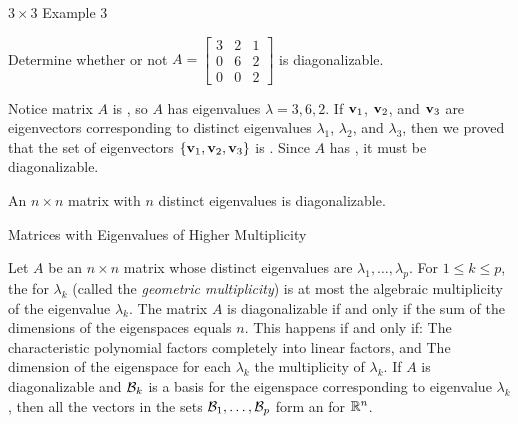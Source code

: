 \documentclass[xcolor=dvipsnames,aspectratio=169,t]{beamer}
\begin{document}
\begin{frame}{$3 \times 3$ Example 3}
  \medskip

  Determine whether or not $A = \begin{bmatrix} 3 & 2 & 1 \\ 0 & 6 & 2 \\  0 & 0 & 2 \end{bmatrix}$ is diagonalizable.
  \bigskip

  \pause
  \bi
  \ii Notice matrix $A$ is , so $A$ has eigenvalues $\lambda = 3, 6, 2$.\ms
  \pause
  \ii If $\mathbf{v}_1$, $\mathbf{v}_2$, and $\mathbf{v}_3$ are eigenvectors corresponding to \alert{distinct} eigenvalues $\lambda_1$, $\lambda_2$, and $\lambda_3$, then we proved that the set of eigenvectors $\left\{ \mathbf{v}_1, \mathbf{v}_2, \mathbf{v}_3 \right\}$ is . \ms
  \pause
  \ii Since $A$ has , it must be diagonalizable.
  \ei
  \bigskip

  \pause
  \begin{theorem}
  An $n \times n$ matrix with \alert{$n$ distinct eigenvalues} is diagonalizable.
  \end{theorem}
\end{frame}


\begin{frame}{Matrices with Eigenvalues of Higher Multiplicity}
  \begin{theorem}
  Let $A$ be an $n \times n$ matrix whose distinct eigenvalues are $\lambda_1, \ldots , \lambda_p$.
  \bb[(a)]
  \ii For $1 \leq k \leq p$, the  for $\lambda_k$ (called the \emph{geometric multiplicity}) is at most the algebraic multiplicity of the eigenvalue $\lambda_k$.
  \medskip
  \pause
  \ii The matrix $A$ is diagonalizable if and only if the sum of the dimensions of the eigenspaces equals $n$.  This happens if and only if:
    \bb[(i)]
    \ii The characteristic polynomial factors completely into linear factors, and
    \ii The dimension of the eigenspace for each $\lambda_k$  the multiplicity of $\lambda_k$.
    \ee
  \medskip
  \pause
  \ii If $A$ is diagonalizable and $\mathcal{B}_k$ is a basis for the eigenspace corresponding to eigenvalue $\lambda_k$, then all the vectors in the sets $\mathcal{B}_1, \ldots, \mathcal{B}_p$ form an  for $\mathbb{R}^n$.
  \ee
\end{theorem}

\end{frame}
\end{document}
